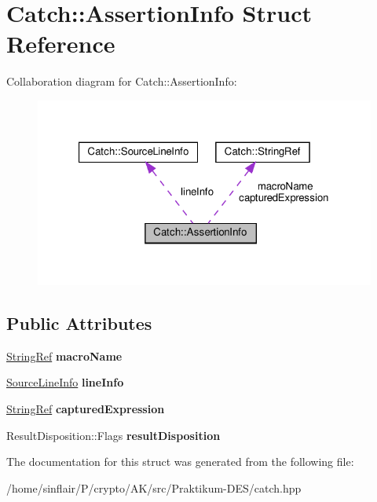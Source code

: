 \hypertarget{structCatch_1_1AssertionInfo}{}\section{Catch\+:\+:Assertion\+Info Struct Reference}
\label{structCatch_1_1AssertionInfo}


Collaboration diagram for Catch\+:\+:Assertion\+Info\+:
\nopagebreak
\begin{figure}[H]
\begin{center}
\leavevmode
\includegraphics[width=321pt]{structCatch_1_1AssertionInfo__coll__graph}
\end{center}
\end{figure}
\subsection*{Public Attributes}
\begin{DoxyCompactItemize}
\item 
\mbox{\label{structCatch_1_1AssertionInfo_aaf3fbb9f1fe09c879ba3d877584e3056}} 
\hyperlink{classCatch_1_1StringRef}{String\+Ref} {\bfseries macro\+Name}
\item 
\mbox{\label{structCatch_1_1AssertionInfo_a17bdbb404ba12658034f833be2f4c3e7}} 
\hyperlink{structCatch_1_1SourceLineInfo}{Source\+Line\+Info} {\bfseries line\+Info}
\item 
\mbox{\label{structCatch_1_1AssertionInfo_accd36744b4acaa3a691a72df0b42190f}} 
\hyperlink{classCatch_1_1StringRef}{String\+Ref} {\bfseries captured\+Expression}
\item 
\mbox{\label{structCatch_1_1AssertionInfo_a60353b3632ab2f827162f2b2d6911073}} 
Result\+Disposition\+::\+Flags {\bfseries result\+Disposition}
\end{DoxyCompactItemize}


The documentation for this struct was generated from the following file\+:\begin{DoxyCompactItemize}
\item 
/home/sinflair/\+P/crypto/\+A\+K/src/\+Praktikum-\/\+D\+E\+S/catch.\+hpp\end{DoxyCompactItemize}
